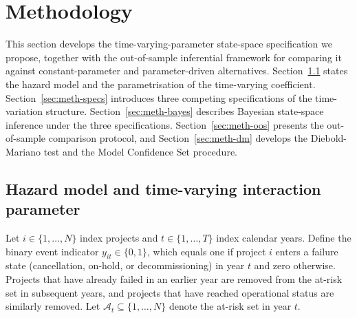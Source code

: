\documentclass[12pt,a4paper]{article}
\theoremstyle{plain}
\theoremstyle{definition}
\begin{document}
\section{Methodology}
\label{sec:methodology}

This section develops the time-varying-parameter state-space specification we propose, together with the out-of-sample inferential framework for comparing it against constant-parameter and parameter-driven alternatives. Section~\ref{sec:meth-setup} states the hazard model and the parametrisation of the time-varying coefficient. Section~\ref{sec:meth-specs} introduces three competing specifications of the time-variation structure. Section~\ref{sec:meth-bayes} describes Bayesian state-space inference under the three specifications. Section~\ref{sec:meth-oos} presents the out-of-sample comparison protocol, and Section~\ref{sec:meth-dm} develops the Diebold-Mariano test and the Model Confidence Set procedure.

\subsection{Hazard model and time-varying interaction parameter}
\label{sec:meth-setup}

Let $i \in \{1, \ldots, N\}$ index projects and $t \in \{1, \ldots, T\}$ index calendar years. Define the binary event indicator $y_{it} \in \{0, 1\}$, which equals one if project $i$ enters a failure state (cancellation, on-hold, or decommissioning) in year $t$ and zero otherwise. Projects that have already failed in an earlier year are removed from the at-risk set in subsequent years, and projects that have reached operational status are similarly removed. Let $\mathcal{A}_t \subseteq \{1, \ldots, N\}$ denote the at-risk set in year $t$.
\end{document}
